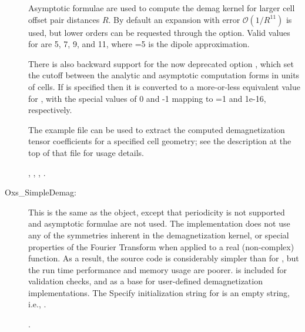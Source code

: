 \begin{description}
   Asymptotic formulae are used to compute the demag kernel for larger
   cell offset pair distances $R$. By default an expansion with error
   $\mathcal{O}\left(1/R^{11}\right)$ is used, but lower orders can be
   requested through the  option. Valid values for
    are 5, 7, 9, and 11, where
   =5 is the dipole approximation.

   There is also backward support for the now deprecated option
   , which set the cutoff between the
   analytic and asymptotic computation forms in units of cells. If
    is specified then it is converted to a
   more-or-less equivalent value for , with
   the special values of 0 and -1 mapping to =1 and
   1e-16, respectively.

   The example file  can be used to extract the
   computed demagnetization tensor coefficients for a specified cell
   geometry; see the description at the top of that file for usage
   details.

   \begin{ExampleMifs}
     , , , .
   \end{ExampleMifs}

%
\item[Oxs\_SimpleDemag:]
   This is the same as the  object, except that
   periodicity is not supported and asymptotic formulae are not used.
   The implementation does not use any of the symmetries
   inherent in the demagnetization kernel, or special properties of the
   Fourier Transform when applied to a real (non-complex) function.
   As a result, the source code is
   considerably simpler than for , but the run time
   performance and memory usage are poorer.   is
   included for validation checks, and as a base for user-defined
   demagnetization implementations.  The Specify initialization string
   for  is an empty string, i.e., \ocb\ccb.

   \begin{ExampleMifs}[Example]
     .
   \end{ExampleMifs}
\end{description}

